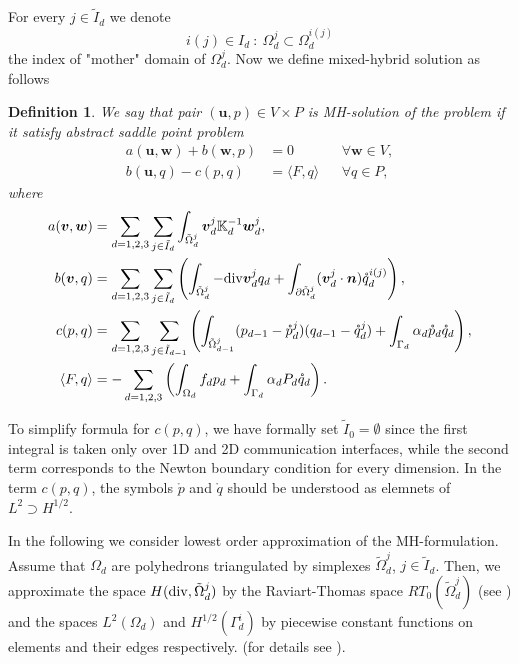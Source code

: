 \documentclass{elsart}
\newtheorem{definition}[thm]{Definition}
\def\div{{\rm div}}
\def\vc#1{\mathbf{\boldsymbol{#1}}}     %
\def\tn#1{{\mathbb{#1}}}    %
\def\prtl{\partial}                                        %
\def\vl{{\vc{u}}}
\begin{document}
For every $j\in\tilde I_d$ we denote 
\[
   i(j) \in I_d\ :\ \Omega_d^j \subset \Omega_d^{i(j)} 
\]
the index of "mother" domain of $\Omega_d^j$. Now we define mixed-hybrid solution as follows
\begin{definition}
We say that pair $(\vl,p)\in V\times P$ is MH-solution of the problem if it satisfy 
abstract saddle point problem
\begin{align}
        \label{Saddle1}
 a(\vl,\vc w) + b(\vc w, p) &= 0 &&\forall \vc w\in V,\\
        \label{Saddle2}
 b(\vl, q) - c(p,q) &= \langle F, q \rangle &&\forall q \in P,
\end{align}
where
\begin{align*}
 a(\vc v,\vc w)&=\sum_{d=1,2,3}\sum_{j\in \tilde I_d} \int_{\tilde\Omega_d^j} \vc v_d^j \tn K_d^{-1} \vc w_d^j,\\
 b(\vc v,q)&=\sum_{d=1,2,3}\sum_{j\in \tilde I_d} 
        \left(
        \int_{\tilde\Omega_d^j} -\div\vc v_d^j q_d
        +\int_{\prtl\tilde\Omega_d^j}
                 (\vc v_d^j \cdot \vc n)\mathring{q}_d^{i(j)}
        \right),\\
 c(p,q)&=\sum_{d=1,2,3} \sum_{j\in \tilde I_{d-1}}
          \left(
          \int_{\tilde\Omega_{d-1}^j} (p_{d-1}-\mathring{p}_{d}^j)(q_{d-1}-\mathring{q}_{d}^j)
          +\int_{\Gamma_d} \alpha_d \mathring{p}_d \mathring{q}_d
          \right),\\
 \langle F, q\rangle &= -\sum_{d=1,2,3}\left(\int_{\Omega_d} f_d p_d +
           \int_{\Gamma_d}  \alpha_d P_d \mathring{q}_d\right).
\end{align*}
\end{definition}
To simplify formula for $c(p,q)$, we have formally set $\tilde I_{0} = \emptyset$ since the first integral is taken 
only over 1D and 2D communication interfaces, while the second term corresponds to the Newton boundary condition for 
every dimension. In the term $c(p,q)$, the symbols $\mathring{p}$ and $\mathring{q}$ should be understood as 
elemnets of $L^2 \supset H^{1/2}$.

In the following we consider lowest order approximation of the MH-formulation. Assume that $\Omega_d$ are polyhedrons 
triangulated by simplexes $\tilde\Omega_d^j$, $j\in \tilde I_d$. 
Then, we approximate the space $H(\div,\tilde\Omega_d^j)$ by the Raviart-Thomas space $RT_0(\tilde\Omega_d^j)$ (see \cite{fortin_mixed_1991}) and the spaces $L^2(\Omega_d)$ and $H^{1/2}(\Gamma_d^i)$ by piecewise constant functions on elements and their edges respectively. (for details see \cite{maryska_mixed-hybrid_1995}).
\end{document}
